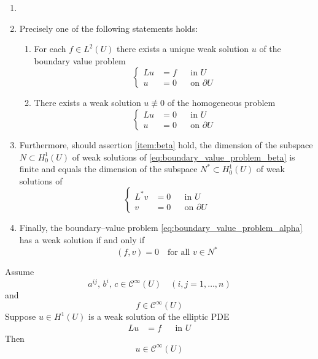 \begin{theorem} \label{teo:weak_solution}	
	\begin{enumerate}[label={(\arabic*)}, topsep=0pt]
		\item[]
		\item Precisely one of the following statements holds:
		\begin{enumerate}[label={(1.\arabic*)}, topsep=0pt]
			\item For each $f \in L^2(U)$ there exists a unique weak solution $u$ of
			the boundary value problem \label{item:alpha}
			\begin{equation} \label{eq:boundary_value_problem_alpha}
				\left\{
					\begin{aligned}
						L u &= f & &\text{in } U \\
						u &= 0 & &\text{on } \partial U
					\end{aligned}
				\right.
			\end{equation}
			\item There exists a weak solution $u \not\equiv 0$ of the homogeneous
			problem \label{item:beta}
			\begin{equation} \label{eq:boundary_value_problem_beta}
				\left\{
					\begin{aligned}
						L u &= 0 & &\text{in } U \\
						u &= 0 & &\text{on } \partial U
					\end{aligned}
				\right.
			\end{equation}
		\end{enumerate}
		\item Furthermore, should assertion \ref{item:beta} hold, the dimension
		of the subspace $N \subset H_0^1(U)$ of weak solutions of
		\eqref{eq:boundary_value_problem_beta} is finite and equals the
		dimension of the subspace $N^\ast \subset H_0^1(U)$ of weak solutions of
		\begin{equation}			
			\left\{
				\begin{aligned}
					L^\ast v &= 0 & &\text{in } U \\
					v &= 0 & &\text{on } \partial U
				\end{aligned}
			\right.
		\end{equation}
		\item Finally, the boundary--value problem
		\eqref{eq:boundary_value_problem_alpha} has a weak solution if and only if 
		\begin{equation}
			(f, v) = 0 \quad \text{for all } v \in N^\ast
		\end{equation}
	\end{enumerate}
\end{theorem}


\begin{theorem}
	Assume
	\[
		a^{ij}, \, b^i, \, c \in \mathcal{C}^\infty(U) \quad 
		(i,j = 1, \ldots, n)	
	\]
	and
	\[
		f \in \mathcal{C}^\infty(U)
	\]
	Suppose $u \in H^1(U)$ is a weak solution of the elliptic PDE
	\[
		\begin{aligned}
			L u &= f & &\text{in } U
		\end{aligned}	
	\]
	Then
	\[
		u \in \mathcal{C}^\infty(U)
	\]
\end{theorem}
